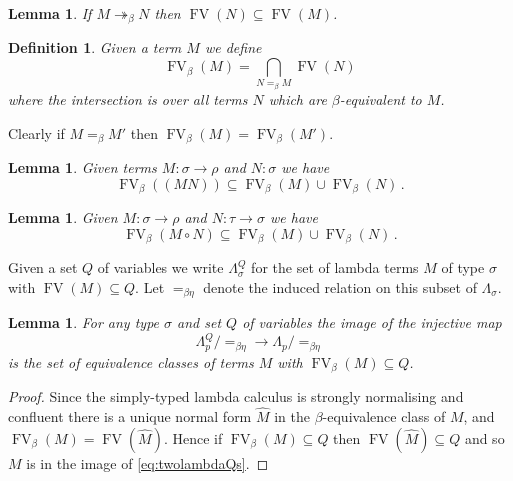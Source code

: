 \documentclass[english,letter paper,12pt,leqno]{article}
\def\be{\begin{equation}}
\def\ee{\end{equation}}
\def\ldot{\,.\,}
\def\typearrow{\Rightarrow}
\def\FV{\operatorname{FV}}
\newtheorem{lemma}[theorem]{Lemma}
\theoremstyle{example}
\newtheorem{definition}[theorem]{Definition}
\newtheorem{example}[theorem]{Example}
\numberwithin{equation}{section}
\def\be{\begin{equation}}
\def\ee{\end{equation}}
\def\ldot{\,.\,}
\def\FV{\operatorname{FV}}
\def\typearrow{\rightarrow}
\begin{document}
\begin{lemma}\label{lemma:beta_reduce_FV} If $M \twoheadrightarrow_\beta N$ then $\FV(N) \subseteq \FV(M)$.
\end{lemma}

\begin{definition} Given a term $M$ we define
	\[
	\FV_\beta(M) = \bigcap_{N =_{\beta} M} \FV(N)
	\]
	where the intersection is over all terms $N$ which are $\beta$-equivalent to $M$. 
\end{definition}

Clearly if $M =_{\beta} M'$ then $\FV_\beta(M) = \FV_\beta(M')$.

\begin{lemma}\label{lem:subset} Given terms $M: \sigma \typearrow \rho$ and $N : \sigma$ we have
	\[
	\FV_\beta( (M N) ) \subseteq \FV_\beta(M) \cup \FV_\beta(N)\,.
	\]
\end{lemma}


\begin{lemma}\label{lemma:comp} Given $M: \sigma \typearrow \rho$ and $N: \tau \typearrow \sigma$ we have
	\be\label{eq:weak_func}
	\FV_\beta( M \circ N ) \subseteq \FV_\beta(M) \cup \FV_\beta(N)\,.
	\ee
\end{lemma}

Given a set $Q$ of variables we write $\Lambda^Q_\sigma$ for the set of lambda terms $M$ of type $\sigma$ with $\operatorname{FV}(M) \subseteq Q$. Let $=_{\beta\eta}$ denote the induced relation on this subset of $\Lambda_\sigma$.

\begin{lemma}\label{lemma:twolambdaQs} For any type $\sigma$ and set $Q$ of variables the image of the injective map
	\be\label{eq:twolambdaQs}
	\Lambda^Q_p/=_{\beta\eta} \longrightarrow \Lambda_p/=_{\beta\eta}
	\ee
	is the set of equivalence classes of terms $M$ with $\operatorname{FV}_\beta(M) \subseteq Q$.
\end{lemma}
\begin{proof}
	Since the simply-typed lambda calculus is strongly normalising \cite[Theorem 3.5.1]{sorensen} and confluent \cite[Theorem 3.6.3]{sorensen} there is a unique normal form $\widehat{M}$ in the $\beta$-equivalence class of $M$, and $\FV_\beta(M) = \FV(\widehat{M})$. Hence if $\operatorname{FV}_\beta(M) \subseteq Q$ then $\operatorname{FV}(\widehat{M}) \subseteq Q$ and so $M$ is in the image of \eqref{eq:twolambdaQs}.
\end{proof}
\end{document}
